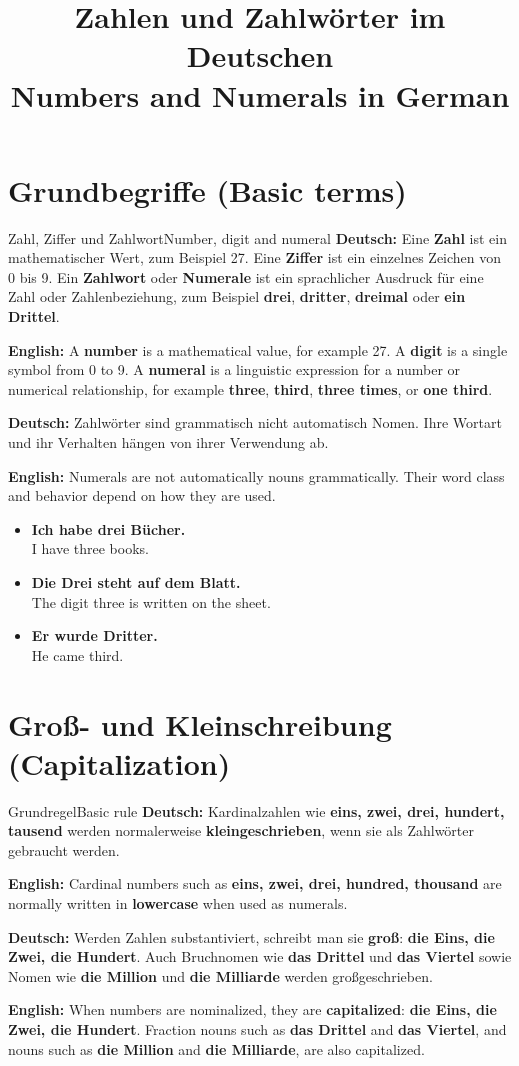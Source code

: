 \documentclass[a4paper,11pt]{article}
\title{Zahlen und Zahlwörter im Deutschen\\\large\textnormal{Numbers and Numerals in German}}
\date{}
\newcommand{\GermanText}[1]{\textbf{Deutsch: }#1\par}
\newcommand{\EnglishText}[1]{{\small\color{SoftGray}\textbf{English: }#1\par}}
\newcommand{\ExampleItem}[2]{\item \textbf{#1}\\{\small\color{SoftGray}#2}}
\begin{document}
\maketitle
\tableofcontents
\newpage

\section{Grundbegriffe \textnormal{(Basic terms)}}
\begin{grammarentry}{Zahl, Ziffer und Zahlwort}{Number, digit and numeral}
\GermanText{Eine \textbf{Zahl} ist ein mathematischer Wert, zum Beispiel 27. Eine \textbf{Ziffer} ist ein einzelnes Zeichen von 0 bis 9. Ein \textbf{Zahlwort} oder \textbf{Numerale} ist ein sprachlicher Ausdruck für eine Zahl oder Zahlenbeziehung, zum Beispiel \textbf{drei}, \textbf{dritter}, \textbf{dreimal} oder \textbf{ein Drittel}.}
\EnglishText{A \textbf{number} is a mathematical value, for example 27. A \textbf{digit} is a single symbol from 0 to 9. A \textbf{numeral} is a linguistic expression for a number or numerical relationship, for example \textbf{three}, \textbf{third}, \textbf{three times}, or \textbf{one third}.}
\GermanText{Zahlwörter sind grammatisch nicht automatisch Nomen. Ihre Wortart und ihr Verhalten hängen von ihrer Verwendung ab.}
\EnglishText{Numerals are not automatically nouns grammatically. Their word class and behavior depend on how they are used.}
\end{grammarentry}

\begin{exbox}
\begin{itemize}
\ExampleItem{Ich habe drei Bücher.}{I have three books.}
\ExampleItem{Die Drei steht auf dem Blatt.}{The digit three is written on the sheet.}
\ExampleItem{Er wurde Dritter.}{He came third.}
\end{itemize}
\end{exbox}

\section{Groß- und Kleinschreibung \textnormal{(Capitalization)}}
\begin{grammarentry}{Grundregel}{Basic rule}
\GermanText{Kardinalzahlen wie \textbf{eins, zwei, drei, hundert, tausend} werden normalerweise \textbf{kleingeschrieben}, wenn sie als Zahlwörter gebraucht werden.}
\EnglishText{Cardinal numbers such as \textbf{eins, zwei, drei, hundred, thousand} are normally written in \textbf{lowercase} when used as numerals.}
\GermanText{Werden Zahlen substantiviert, schreibt man sie \textbf{groß}: \textbf{die Eins, die Zwei, die Hundert}. Auch Bruchnomen wie \textbf{das Drittel} und \textbf{das Viertel} sowie Nomen wie \textbf{die Million} und \textbf{die Milliarde} werden großgeschrieben.}
\EnglishText{When numbers are nominalized, they are \textbf{capitalized}: \textbf{die Eins, die Zwei, die Hundert}. Fraction nouns such as \textbf{das Drittel} and \textbf{das Viertel}, and nouns such as \textbf{die Million} and \textbf{die Milliarde}, are also capitalized.}
\end{grammarentry}
\end{document}
